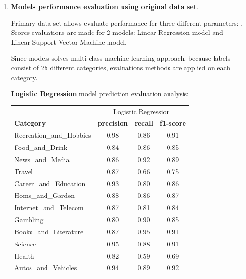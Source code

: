 \begin{enumerate}
    \item \textbf{Models performance evaluation using original data set}.
    
    Primary data set allows evaluate performance for three different parameters: . Scores evaluations are made for 2 models: Linear Regression model and Linear Support Vector Machine model. 
    
    Since models solves multi-class machine learning approach, because labels consist of 25 different categories, evaluations methods are applied on each category.
    
    \pagebreak
    \textbf{Logistic Regression} model prediction evaluation analysis:

    \begin{table}[H]
        \centering
        \begin{tabular}{l|c|c|c|}
            \hline
            \multicolumn{1}{c}{}  & \multicolumn{3}{|c|}{Logistic Regression}\\\cline{2-4}
            \textbf{Category} & \multicolumn{1}{l|}{\textbf{precision}} & \multicolumn{1}{l|}{\textbf{recall}} & \multicolumn{1}{l|}{\textbf{f1-score}} \\ \hline
            Recreation\_and\_Hobbies & 0.98 & 0.86 & 0.91 \\ \cline{2-4} 
            Food\_and\_Drink & 0.84 & 0.86 & 0.85 \\ \cline{2-4} 
            News\_and\_Media &  0.86 & 0.92 & 0.89  \\ \cline{2-4} 
            Travel & 0.87 & 0.66 & 0.75  \\ \cline{2-4} 
            Career\_and\_Education & 0.93 & 0.80 & 0.86 \\ \cline{2-4} 
            Home\_and\_Garden & 0.88 & 0.86 & 0.87 \\ \cline{2-4} 
            Internet\_and\_Telecom & 0.87 & 0.81 & 0.84 \\ \cline{2-4} 
            Gambling & 0.80 & 0.90 & 0.85 \\ \cline{2-4} 
            Books\_and\_Literature & 0.87 & 0.95 & 0.91 \\ \cline{2-4} 
            Science & 0.95 & 0.88 & 0.91 \\ \cline{2-4} 
            Health & 0.82 & 0.59 & 0.69  \\ \cline{2-4} 
            Autos\_and\_Vehicles & 0.94 & 0.89 & 0.92 \\ \cline{2-4} 

\end{tabular}
\end{table}
\end{enumerate}
